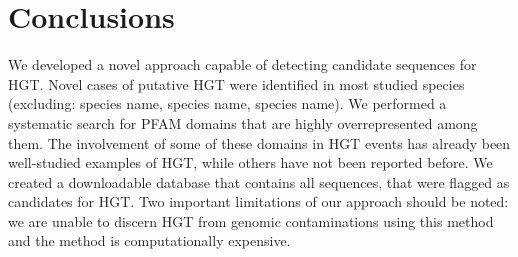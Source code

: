 \section{Conclusions}
We developed a novel approach capable of detecting candidate sequences for HGT.
Novel cases of putative HGT were identified in most studied species (excluding:
species name, species name, species name). We performed a systematic search for
PFAM domains that are highly overrepresented among them. The involvement of
some of these domains in HGT events has already been well-studied examples
of HGT, while others have not been reported before. We created a downloadable
database that contains all sequences, that were flagged as candidates for HGT.
Two important limitations of our approach should be noted: we are unable to
discern HGT from genomic contaminations using this method and the method is
computationally expensive.
